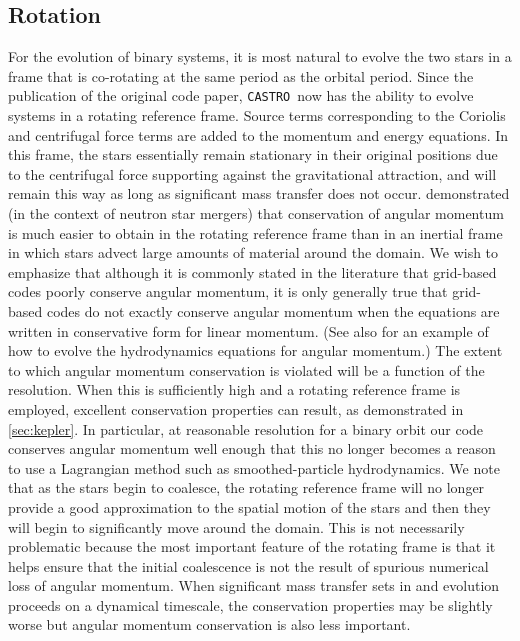 \documentclass[iop]{../emulateapj}
\newcommand{\castro}{\texttt{CASTRO}}
\begin{document}
\subsection{Rotation}\label{sec:rotation}

For the evolution of binary systems, it is most natural to evolve the
two stars in a frame that is co-rotating at the same period as the
orbital period. Since the publication of the original code paper, \castro\ 
now has the ability to evolve systems in a rotating reference frame. 
Source terms corresponding to the Coriolis and centrifugal 
force terms are added to the momentum and energy equations. In this frame, 
the stars essentially remain stationary in their original positions due to the
centrifugal force supporting against the gravitational attraction, and
will remain this way as long as significant mass transfer does not
occur. \cite{swc:2000} demonstrated (in the context of neutron star
mergers) that conservation of angular momentum is much easier to
obtain in the rotating reference frame than in an inertial frame in
which stars advect large amounts of material around the domain. We
wish to emphasize that although it is commonly stated in the
literature that grid-based codes poorly conserve angular momentum,
it is only generally true that grid-based codes do not exactly conserve 
angular momentum when the equations are written in conservative form
for linear momentum. (See also \cite{motl:2002} for an example of how 
to evolve the hydrodynamics equations for angular momentum.) 
The extent to which angular momentum conservation is violated
will be a function of the resolution. When this is sufficiently high
and a rotating reference frame is employed, excellent conservation
properties can result, as demonstrated in \autoref{sec:kepler}. 
In particular, at reasonable resolution for a binary orbit our code 
conserves angular momentum well enough that this no longer becomes 
a reason to use a Lagrangian method such as smoothed-particle hydrodynamics.
We note that as the stars begin to coalesce, the rotating reference frame
will no longer provide a good approximation to the spatial motion of
the stars and then they will begin to significantly move around the
domain. This is not necessarily problematic because the most important
feature of the rotating frame is that it helps ensure that the initial
coalescence is not the result of spurious numerical loss of angular
momentum. When significant mass transfer sets in and evolution
proceeds on a dynamical timescale, the conservation properties may be
slightly worse but angular momentum conservation is also less
important.
\end{document}

